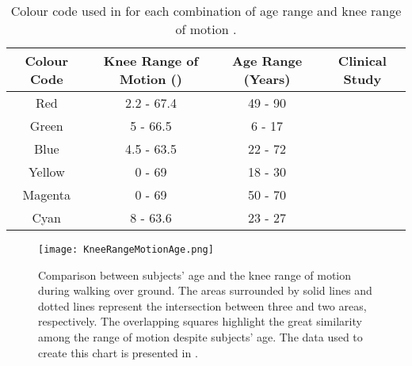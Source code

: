 \begin{table}[htb!]
\caption[Colour code used in  for each combination of age range and knee range of motion.]{Colour code used in  for each combination of age range and knee range of motion  \cite{solis2017characterization}.}
\label{tbl:KneeRangeMotionage}
\begin{tabular}{c|c|c|c}
\hline
Colour Code & Knee Range of Motion (\degree{}) & Age Range (Years) & Clinical Study \\
\hline
Red         & 2.2 - 67.4               & 49 - 90           & \cite{rowe2000knee}       \\
Green       & 5 - 66.5                 & 6 - 17            & \cite{bovi2011multiple}        \\
Blue        & 4.5 - 63.5               & 22 - 72           & \cite{bovi2011multiple}           \\
Yellow      & 0 - 69                   & 18 - 30           & \cite{lee2008biomechanics}        \\
Magenta     & 0 - 69                   & 50 - 70           & \cite{lee2008biomechanics}     \\
Cyan        & 8 - 63.6                 & 23 - 27           & \cite{han2011biomechanical}    \\  
\hline
\end{tabular}
\end{table}

\begin{figure}[htb!]
    \centering
    \texttt{[image: KneeRangeMotionAge.png]}
    \caption[Comparison between subjects' age and the knee range of motion during walking over ground. The areas surrounded by solid lines and dotted lines represent the intersection between three and two areas, respectively. The overlapping squares highlight the great similarity among the range of motion despite subjects' age. The data used to create this chart is presented in ]{Comparison between subjects' age and the knee range of motion during walking over ground. The areas surrounded by solid lines and dotted lines represent the intersection between three and two areas, respectively. The overlapping squares highlight the great similarity among the range of motion despite subjects' age. The data used to create this chart is presented in  \cite{solis2017characterization}. }
    \label{fig:KneeRangeAge}
\end{figure}

